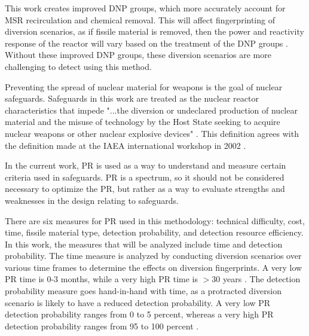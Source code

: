 This work creates improved \gls{DNP} groups, which more accurately account for \gls{MSR} recirculation and chemical removal.
This will affect fingerprinting of diversion scenarios, as if fissile material is removed, then the power and reactivity response of the reactor will vary based on the treatment of the \gls{DNP} groups \cite{wheeler2021signatures}.
Without these improved \gls{DNP} groups, these diversion scenarios are more challenging to detect using this method.

Preventing the spread of nuclear material for weapons is the goal of nuclear safeguards.
Safeguards in this work are treated as the nuclear reactor characteristics that impede "...the diversion or undeclared production of nuclear material and the misuse of technology by the Host State seeking to acquire nuclear weapons or other nuclear explosive devices" \cite{protection2011evaluation}.
This definition agrees with the definition made at the \gls{IAEA} international workshop in 2002 \cite{IAEA2002Proliferation}. 

In the current work, \gls{PR} is used as a way to understand and measure certain criteria used in safeguards.
\gls{PR} is a spectrum, so it should not be considered necessary to optimize the \gls{PR}, but rather as a way to evaluate strengths and weaknesses in the design relating to safeguards.

There are six measures for \gls{PR} used in this methodology: technical difficulty, cost, time, fissile material type, detection probability, and detection resource efficiency.
In this work, the measures that will be analyzed include time and detection probability.
The time measure is analyzed by conducting diversion scenarios over various time frames to determine the effects on diversion fingerprints.
A very low \gls{PR} time is 0-3 months, while a very high \gls{PR} time is $>$30 years \cite{protection2011evaluation}.
The detection probability measure goes hand-in-hand with time, as a protracted diversion scenario is likely to have a reduced detection probability.
A very low \gls{PR} detection probability ranges from 0 to 5 percent, whereas a very high \gls{PR} detection probability ranges from 95 to 100 percent \cite{protection2011evaluation}.

